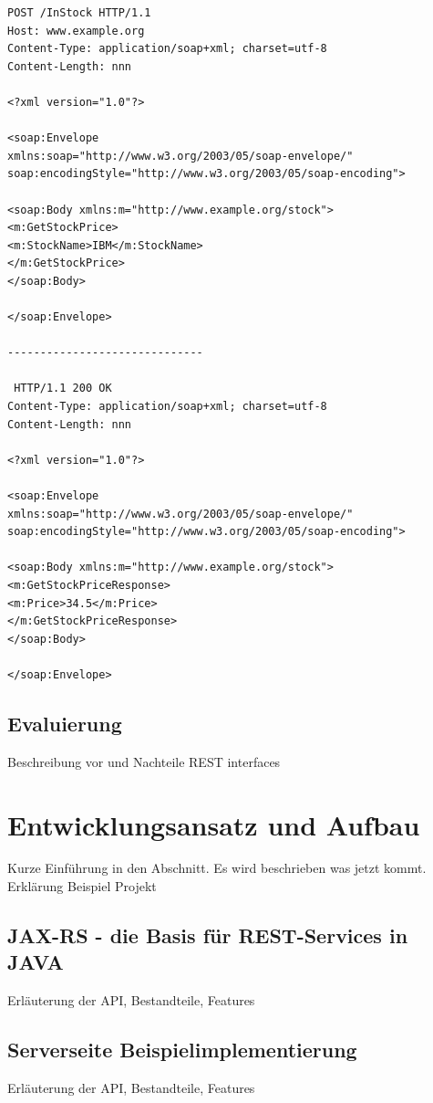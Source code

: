 \documentclass[fleqn,10pt,ngerman]{SelfArx}
\begin{document}
\begin{lstlisting}[caption=Beispiel: SOAP-Request und SOAP-Response als Envelope, label=envelopesoap]
 POST /InStock HTTP/1.1
Host: www.example.org
Content-Type: application/soap+xml; charset=utf-8
Content-Length: nnn

<?xml version="1.0"?>

<soap:Envelope
xmlns:soap="http://www.w3.org/2003/05/soap-envelope/"
soap:encodingStyle="http://www.w3.org/2003/05/soap-encoding">

<soap:Body xmlns:m="http://www.example.org/stock">
<m:GetStockPrice>
<m:StockName>IBM</m:StockName>
</m:GetStockPrice>
</soap:Body>

</soap:Envelope>

------------------------------

 HTTP/1.1 200 OK
Content-Type: application/soap+xml; charset=utf-8
Content-Length: nnn

<?xml version="1.0"?>

<soap:Envelope
xmlns:soap="http://www.w3.org/2003/05/soap-envelope/"
soap:encodingStyle="http://www.w3.org/2003/05/soap-encoding">

<soap:Body xmlns:m="http://www.example.org/stock">
<m:GetStockPriceResponse>
<m:Price>34.5</m:Price>
</m:GetStockPriceResponse>
</soap:Body>

</soap:Envelope>
\end{lstlisting}

\subsection{Evaluierung}
Beschreibung vor und Nachteile REST interfaces

\section{Entwicklungsansatz und Aufbau}
Kurze Einführung in den Abschnitt. Es wird beschrieben was jetzt kommt. Erklärung Beispiel Projekt

\subsection{JAX-RS - die Basis für REST-Services in JAVA}
Erläuterung der API, Bestandteile, Features 

\subsection{Serverseite Beispielimplementierung}
Erläuterung der API, Bestandteile, Features 
\end{document}
